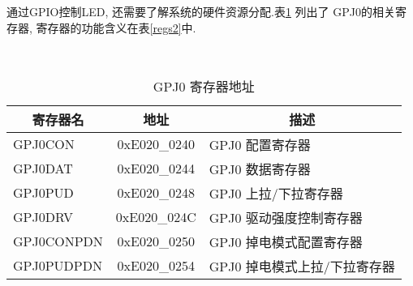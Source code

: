 	通过GPIO控制LED, 还需要了解系统的硬件资源分配.表{}\ref{regs1} 列出了
GPJ0的相关寄存器, 寄存器的功能含义在表{}\ref{regs2}中.
	
\begin{table}[!h]
\centering
\caption{GPJ0 寄存器地址}\label{regs1} \ \\

\begin{tabular}{|l|c|l|} \toprule
\multicolumn{1}{|c|}{寄存器名} & 地址 & 
\multicolumn{1}{c|}{描述} \\\midrule
	GPJ0CON   & 0xE020\_0240 & GPJ0 配置寄存器              \\\hline
	GPJ0DAT   & 0xE020\_0244 & GPJ0 数据寄存器              \\\hline
	GPJ0PUD   & 0xE020\_0248 & GPJ0 上拉/下拉寄存器         \\\hline
	GPJ0DRV   & 0xE020\_024C & GPJ0 驱动强度控制寄存器      \\\hline
	GPJ0CONPDN& 0xE020\_0250 & GPJ0 掉电模式配置寄存器      \\\hline
	GPJ0PUDPDN& 0xE020\_0254 & GPJ0 掉电模式上拉/下拉寄存器 \\\bottomrule
\end{tabular}
\end{table}


